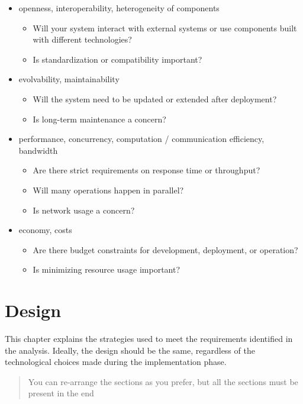 \documentclass{scrartcl}
\begin{document}
\begin{itemize}
  \item openness, interoperability, heterogeneity of components
  \begin{itemize}
    \item Will your system interact with external systems or use components built with different technologies?
    \item Is standardization or compatibility important?
  \end{itemize}

  \item evolvability, maintainability
  \begin{itemize}
    \item Will the system need to be updated or extended after deployment?
    \item Is long-term maintenance a concern?
  \end{itemize}

  \item performance, concurrency, computation / communication efficiency, bandwidth
  \begin{itemize}
    \item Are there strict requirements on response time or throughput?
    \item Will many operations happen in parallel?
    \item Is network usage a concern?
  \end{itemize}

  \item economy, costs  
  \begin{itemize}
    \item Are there budget constraints for development, deployment, or operation?
    \item Is minimizing resource usage important?
  \end{itemize}
\end{itemize}

\section{Design}\label{design}

This chapter explains the strategies used to meet the requirements identified in the analysis. 
%
Ideally, the design should be the same, regardless of the technological choices made during the implementation phase.

\begin{quote}
You can re-arrange the sections as you prefer, but all the sections must be present in the end
\end{quote}
\end{document}
